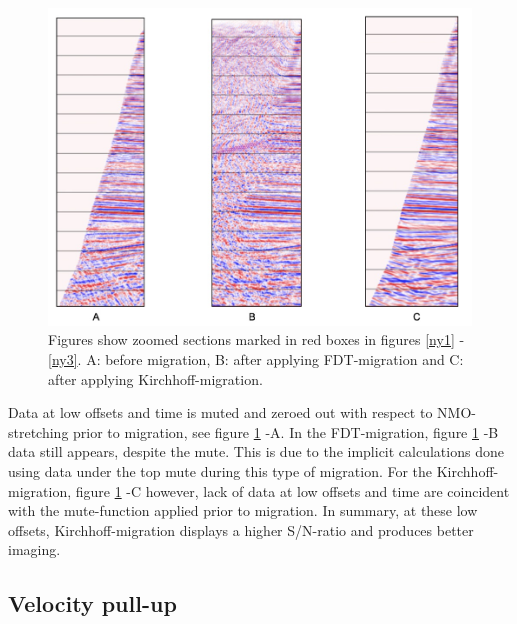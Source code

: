 \documentclass[10pt,a4paper]{article}
\begin{document}
\begin{figure}[H]
\includegraphics[width=\textwidth]{ny4.jpg}
\caption{Figures show zoomed sections marked in red boxes in figures \ref{ny1} - \ref{ny3}. A: before migration, B: after applying FDT-migration and C: after applying Kirchhoff-migration.}
\label{ny4}
\end{figure}

\noindent Data at low offsets and time is muted and zeroed out with respect to NMO-stretching prior to migration, see figure \ref{ny4} -A. In the FDT-migration, figure \ref{ny4} -B data still appears, despite the mute. This is due to the implicit calculations done using data under the top mute during this type of migration. For the Kirchhoff-migration, figure \ref{ny4} -C however, lack of data at low offsets and time are coincident with the mute-function applied prior to migration. In summary, at these low offsets, Kirchhoff-migration displays a higher S/N-ratio and produces better imaging. 

\subsection{Velocity pull-up}
\end{document}
